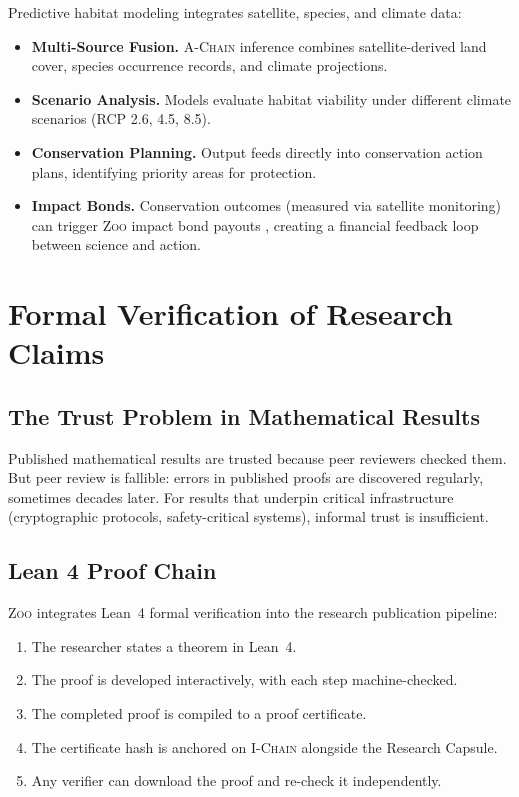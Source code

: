 \documentclass[11pt,letterpaper]{article}
\theoremstyle{definition}
\theoremstyle{remark}
\newcommand{\Zoo}{\textsc{Zoo}}
\newcommand{\AChain}{\textsc{A-Chain}}
\newcommand{\IChain}{\textsc{I-Chain}}
\begin{document}
Predictive habitat modeling integrates satellite, species, and climate data:

\begin{itemize}
    \item \textbf{Multi-Source Fusion.} \AChain{} inference combines satellite-derived land cover, species occurrence records, and climate projections.
    \item \textbf{Scenario Analysis.} Models evaluate habitat viability under different climate scenarios (RCP 2.6, 4.5, 8.5).
    \item \textbf{Conservation Planning.} Output feeds directly into conservation action plans, identifying priority areas for protection.
    \item \textbf{Impact Bonds.} Conservation outcomes (measured via satellite monitoring) can trigger \Zoo{} impact bond payouts \cite{zoo-impact-bonds}, creating a financial feedback loop between science and action.
\end{itemize}

\section{Formal Verification of Research Claims}
\label{sec:verification}

\subsection{The Trust Problem in Mathematical Results}

Published mathematical results are trusted because peer reviewers checked them. But peer review is fallible: errors in published proofs are discovered regularly, sometimes decades later. For results that underpin critical infrastructure (cryptographic protocols, safety-critical systems), informal trust is insufficient.

\subsection{Lean 4 Proof Chain}

\Zoo{} integrates Lean~4 \cite{demoura2021lean4} formal verification into the research publication pipeline:

\begin{enumerate}
    \item The researcher states a theorem in Lean~4.
    \item The proof is developed interactively, with each step machine-checked.
    \item The completed proof is compiled to a proof certificate.
    \item The certificate hash is anchored on \IChain{} alongside the Research Capsule.
    \item Any verifier can download the proof and re-check it independently.
\end{enumerate}
\end{document}
